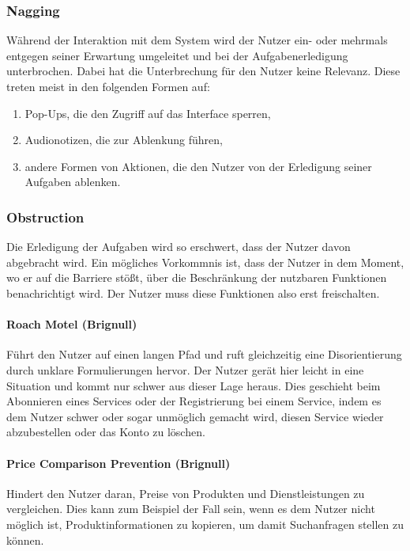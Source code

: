 \documentclass[a4paper]{article}
\begin{document}
\subsubsection{Nagging}
Während der Interaktion mit dem System wird der Nutzer ein- oder mehrmals entgegen seiner Erwartung umgeleitet und bei der Aufgabenerledigung unterbrochen. Dabei hat die Unterbrechung für den Nutzer keine Relevanz. Diese treten meist in den folgenden Formen auf:
\begin{enumerate}[label=\arabic*)]
	\item{Pop-Ups, die den Zugriff auf das Interface sperren,}
	\item{Audionotizen, die zur Ablenkung führen,}
	\item{andere Formen von Aktionen, die den Nutzer von der Erledigung seiner Aufgaben ablenken.}
\end{enumerate}

\subsubsection{Obstruction} 
Die Erledigung der Aufgaben wird so erschwert, dass der Nutzer davon abgebracht wird. Ein mögliches Vorkommnis ist, dass der Nutzer in dem Moment, wo er auf die Barriere stößt, über die Beschränkung der nutzbaren Funktionen benachrichtigt wird. Der Nutzer muss diese Funktionen also erst freischalten.	

\paragraph{Roach Motel (Brignull)} 
Führt den Nutzer auf einen langen Pfad und ruft gleichzeitig eine Disorientierung durch unklare Formulierungen hervor. Der Nutzer gerät hier leicht in eine Situation und kommt nur schwer aus dieser Lage heraus. Dies geschieht beim Abonnieren eines Services oder der Registrierung bei einem Service, indem es dem Nutzer schwer oder sogar unmöglich gemacht wird, diesen Service wieder abzubestellen oder das Konto zu löschen.

\paragraph{Price Comparison Prevention (Brignull)} 
Hindert den Nutzer daran, Preise von Produkten und Dienstleistungen zu vergleichen. Dies kann zum Beispiel der Fall sein, wenn es dem Nutzer nicht möglich ist, Produktinformationen zu kopieren, um damit Suchanfragen stellen zu können.
\end{document}
